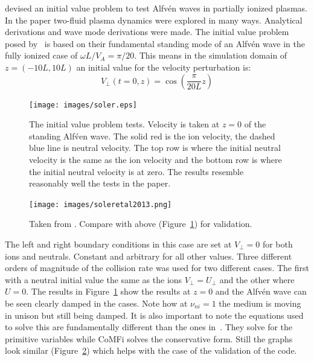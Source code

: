 \documentclass[12pt,upcase]{umlthesis}
\begin{document}
\citet{Soler2013} devised an initial value problem to test Alfv\'en waves in partially ionized plasmas. In the paper two-fluid plasma dynamics were explored in many ways. Analytical derivations and wave mode derivations were made. The initial value problem posed by~\citet{Soler2013} is based on their fundamental standing mode of an Alfv\'en wave in the fully ionized case of $\omega L / V_A = \pi / 20$. This means in the simulation domain of $z = (-10L,10L)$ an initial value for the velocity perturbation is:
\begin{equation}\label{eq:solerintial}
	V_{\perp}(t=0,z) = \cos{(\frac{\pi}{20 L} z)}
\end{equation}

\begin{figure}[ht!]
	\centering
	\texttt{[image: images/soler.eps]}
	\caption{The \citet{Soler2013} initial value problem tests. Velocity is taken at $z=0$ of the standing Alf\'ven wave. The solid red is the ion velocity, the dashed blue line is neutral velocity. The top row is where the initial neutral velocity is the same as the ion velocity and the bottom row is where the initial neutral velocity is at zero. The results resemble reasonably well the tests in the \citet{Soler2013} paper.}\label{fig:soler}
\end{figure}

\begin{figure}[ht!]
	\centering
	\texttt{[image: images/soleretal2013.png]}
	\caption{Taken from \citet{Soler2013}. Compare with above (Figure~\ref{fig:soler}) for validation.}\label{fig:soleretal2013}
\end{figure}

The left and right boundary conditions in this case are set at $V_{\perp} = 0$ for both ions and neutrals. Constant and arbitrary for all other values. Three different orders of magnitude of the collision rate was used for two different cases. The first with a neutral initial value the same as the ions $V_{\perp} = U_{\perp}$ and the other where $U=0$. The results in Figure~\ref{fig:soler} show the results at $z=0$ and the Alfv\'en wave can be seen clearly damped in the cases. Note how at $\nu_{ni}=1$ the medium is moving in unison but still being damped. It is also important to note the equations used to solve this are fundamentally different than the ones in~\citet{Soler2013}. They solve for the primitive variables while CoMFi solves the conservative form. Still the graphs look similar (Figure~\ref{fig:soleretal2013}) which helps with the case of the validation of the code.
\end{document}
